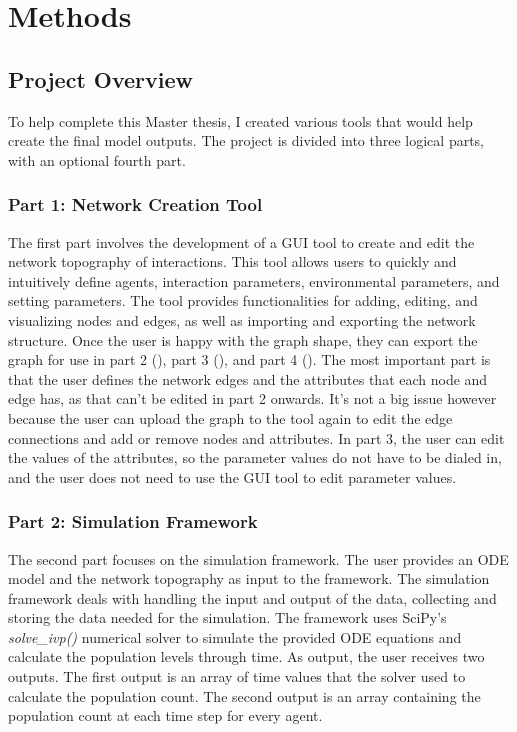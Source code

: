 \chapter{Methods}
\label{Methods}
\section{Project Overview}
To help complete this Master thesis, I created various tools that would help create the final model outputs.
The project is divided into three logical parts, with an optional fourth part.


\subsection{Part 1: Network Creation Tool}
\label{sec:part1}
The first part involves the development of a GUI tool to create and edit the network topography of interactions.
This tool allows users to quickly and intuitively define agents, interaction parameters, environmental parameters, and setting parameters.
The tool provides functionalities for adding, editing, and visualizing nodes and edges, as well as importing and exporting the network structure. \newline 
Once the user is happy with the graph shape, they can export the graph for use in part 2 (), part 3 (), and part 4 (). 
The most important part is that the user defines the network edges and the attributes that each node and edge has, as that can't be edited in part 2 onwards. 
It's not a big issue however because the user can upload the graph to the tool again to edit the edge connections and add or remove nodes and attributes. 
In part 3, the user can edit the values of the attributes, so the parameter values do not have to be dialed in, and the user does not need to use the GUI tool to edit parameter values. 


\subsection{Part 2: Simulation Framework}
\label{sec:part2}
The second part focuses on the simulation framework.
The user provides an ODE model and the network topography as input to the framework.
The simulation framework deals with handling the input and output of the data, collecting and storing the data needed for the simulation.
The framework uses SciPy's \textit{solve\_ivp()} numerical solver to simulate the provided ODE equations and calculate the population levels through time.
As output, the user receives two outputs.
The first output is an array of time values that the solver used to calculate the population count.
The second output is an array containing the population count at each time step for every agent.


